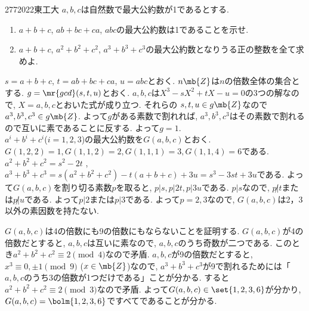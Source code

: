 \begin{thm}{277}{}{2022東工大}
    $a,b,c$は自然数で最大公約数が1であるとする. 
    \begin{enumerate}
    \item $a+b+c$, $ab+bc+ca$, $abc$の最大公約数は1であることを示せ. 
    \item $a+b+c$, $a^2+b^2+c^2$, $a^3+b^3+c^3$の最大公約数となりうる正の整数を全て求めよ.
    \end{enumerate}
\end{thm}
$s=a+b+c$, $t=ab + bc + ca$, $u = abc$とおく. $n\mb{Z}$は$n$の倍数全体の集合とする. 
$g=\mr{gcd}(s,t,u)$とおく. $a,b,c$は$X^3 - sX^2 + tX - u = 0$の3つの解なので, $X=a,b,c$とおいた式が成り立つ. 
それらの $s,t,u\in g\mb{Z}$なので$a^3,b^3,c^3\in g\mb{Z}$. 
よって$g$がある素数で割れれば, $a^3,b^3,c^3$はその素数で割れるので互いに素であることに反する. よって$g=1$.\\  
$a^i+b^i+c^i$($i=1,2,3$)の最大公約数を$G(a,b,c)$とおく. $G(1,2,2) = 1, G(1,1,2) = 2, G(1,1,1) = 3, G(1,1,4) = 6$である. 
$a^2 + b^2 + c^2 = s^2 - 2t$ , $a^3 + b^3 + c^3 = s(a^2 + b^2 + c^2) - t(a+b+c) + 3u = s^3 - 3st  +  3u$である. 
よって$G(a,b,c)$を割り切る素数$p$を取ると, $p|s, p|2t, p|3u$である. $p|s$なので, $p\not | t$または$p\not | u$である.
 よって$p|2$または$p|3$である. よって$p=2,3$なので, $G(a,b,c)$は2，3以外の素因数を持たない. \par
$G(a,b,c)$は4の倍数にも9の倍数にもならないことを証明する. $G(a,b,c)$が4の倍数だとすると, $a,b,c$は互いに素なので, $a,b,c$のうち奇数が二つである.
 このとき$a^2 + b^2 + c^2\equiv 2\pmod{4}$なので矛盾. 
 $a,b,c$が9の倍数だとすると, $x^3 \equiv 0,\pm 1\pmod{9}$ ($x\in \mb{Z}$)なので,
  $a^3 + b^3 + c^3$が9で割れるためには「$a,b,c$のうち3の倍数が1つだけである」ことが分かる. 
  すると$a^2 + b^2 + c^2 \equiv 2\pmod{3}$なので矛盾. よって$G(a,b,c) \in \set{1,2,3,6}$が分かり,
   $G(a,b,c) = \bolm{1,2,3,6}$ですべてであることが分かる. 
